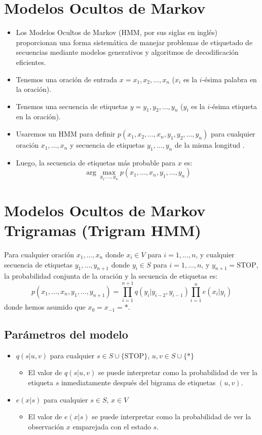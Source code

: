 \section{Modelos Ocultos de Markov}

\begin{itemize}
  \item Los Modelos Ocultos de Markov (HMM, por sus siglas en inglés) proporcionan una forma sistemática de manejar problemas de etiquetado de secuencias mediante modelos generativos y algoritmos de decodificación eficientes.
  \item Tenemos una oración de entrada $x = x_1, x_2, \ldots, x_n$ ($x_i$ es la $i$-ésima palabra en la oración).
  \item Tenemos una secuencia de etiquetas $y = y_1, y_2, \ldots, y_n$ ($y_i$ es la $i$-ésima etiqueta en la oración).
  \item Usaremos un HMM para definir $p(x_1, x_2, \ldots, x_n, y_1, y_2, \ldots, y_n)$ para cualquier oración $x_1, \ldots, x_n$ y secuencia de etiquetas $y_1, \ldots, y_n$ de la misma longitud \cite{kupiec1992robust}.
  \item Luego, la secuencia de etiquetas más probable para $x$ es:
  \[
    \arg\max_{y_1,\ldots, y_n} p(x_1, \ldots, x_n, y_1, \ldots, y_n)
  \]
\end{itemize}

\section{Modelos Ocultos de Markov Trigramas (Trigram HMM)}

Para cualquier oración $x_1, \ldots, x_n$ donde $x_i \in V$ para $i = 1, \ldots, n$, y cualquier secuencia de etiquetas $y_1, \ldots, y_{n+1}$ donde $y_i \in S$ para $i = 1, \ldots, n$, y $y_{n+1} = \text{STOP}$, la probabilidad conjunta de la oración y la secuencia de etiquetas es:
\[
  p(x_1, \ldots, x_n, y_1, \ldots, y_{n+1}) = \prod_{i=1}^{n+1} q(y_i | y_{i-2}, y_{i-1}) \prod_{i=1}^{n} e(x_i | y_i)
\]
donde hemos asumido que $x_0 = x_{-1} = *$.

\subsection{Parámetros del modelo}

\begin{itemize}
  \item $q(s|u, v)$ para cualquier $s \in S \cup \{\text{STOP}\}$, $u, v \in S \cup \{*\}$
  \begin{itemize}
    \item El valor de $q(s|u,v)$ se puede interpretar como la probabilidad de ver la etiqueta $s$ inmediatamente después del bigrama de etiquetas $(u, v)$.
  \end{itemize}
  \item $e(x|s)$ para cualquier $s \in S$, $x \in V$ 
  \begin{itemize}
    \item El valor de $e(x|s)$ se puede interpretar como la probabilidad de ver la observación $x$ emparejada con el estado $s$.
  \end{itemize}
\end{itemize}

